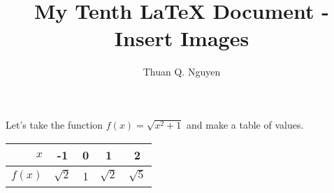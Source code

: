 \documentclass{article}
\begin{document}
\title{My Tenth \LaTeX{} Document - Insert Images}
\author{Thuan Q. Nguyen}
\maketitle


Let's take the function $f(x) = \sqrt{x^2+1}$ and make a table of values.

\begin{center}
\begin{tabular}{r|cccc}
$x$       &  -1 & 0 & 1 & 2 \\
\hline
$f(x)$    & $\sqrt{2}$ & 1 & $\sqrt{2}$ & $\sqrt{5}$
\end{tabular}
\end{center}
\end{document}
